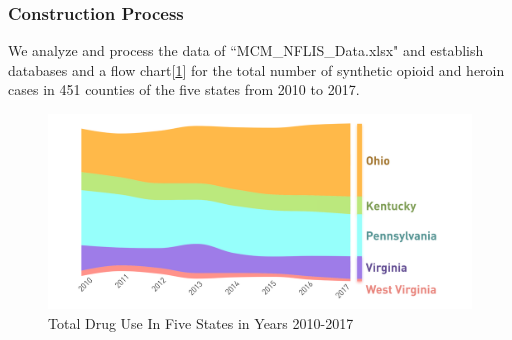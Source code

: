 \documentclass{mcmthesis}
\begin{document}
\subsubsection{Construction Process}
We analyze and process the data of ``MCM\_NFLIS\_Data.xlsx" and establish databases and a flow chart[\ref{sum_flowchart}] for the total number of synthetic opioid and heroin cases in 451 counties of the five states from 2010 to 2017.
\begin{figure}[ht]
	\centering
	\includegraphics[width=15cm]{figure-release/StateSum.png}
	\caption{Total Drug Use In Five States in Years 2010-2017}\label{sum_flowchart}
\end{figure}
\end{document}
